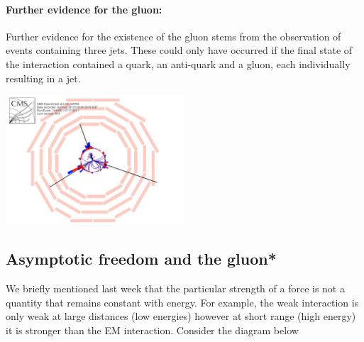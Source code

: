 \paragraph{Further evidence for the gluon:}
Further evidence for the existence of the gluon stems from the observation of events containing three jets. These could only have occurred if the final state of the interaction contained a quark, an anti-quark and a gluon, each individually resulting in a jet.
\begin{center}
\includegraphics[width=0.5\textwidth]{fig/strongforce/cms_trijet.png}
\end{center}

\subsection{Asymptotic freedom and the gluon*}
We briefly mentioned last week that the particular strength of a force
is not a quantity that remains constant with energy. For example, the weak interaction is only weak at large distances (low energies) however at short range (high energy) it is stronger than the EM interaction. Consider the diagram below

